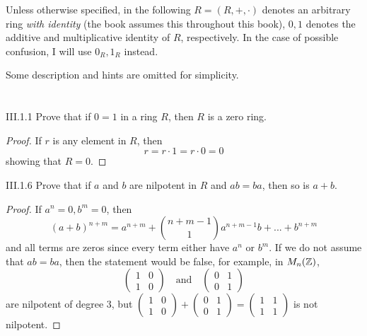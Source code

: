 Unless otherwise specified, in the following $R = (R,+,\cdot)$ denotes an arbitrary ring \emph{with identity} (the book assumes this throughout this book), $0, 1$ denotes the additive and multiplicative identity of $R$, respectively. In the case of possible confusion, I will use $0_R, 1_R$ instead. 

Some description and hints are omitted for simplicity.

\section{}

\begin{problem}{III.1.1}
Prove that if $0 = 1$ in a ring $R$, then $R$ is a zero ring.
\end{problem}
\begin{proof}
If $r$ is any element in $R$, then
\[
r = r \cdot 1 = r \cdot 0 = 0  
\]
showing that $R = 0$.
\end{proof}
\begin{problem}{III.1.6}
Prove that if $a$ and $b$ are nilpotent in $R$ and $ab = ba$, then so is $a+b$.
\end{problem}
\begin{proof}
If $a^n = 0, b^m = 0$, then
\[
(a+b)^{n+m} = a^{n+m} +\binom{n+m-1}{1} a^{n+m-1}b + ... + b^{n+m}
\]
and all terms are zeros since every term either have $a^n$ or $b^m$. If we do not assume that $ab = ba$, then the statement would be false, for example, in $M_n(\mathbb{Z})$,
\[
\begin{pmatrix} 
1 & 0 \\
1 & 0
\end{pmatrix}
\quad \text{and} \quad
\begin{pmatrix} 
0 & 1 \\
0 & 1 
\end{pmatrix}
\]
are nilpotent of degree $3$, but
$\begin{pmatrix} 
1 & 0 \\
1 & 0
\end{pmatrix} + 
\begin{pmatrix} 
0 & 1 \\
0 & 1 
\end{pmatrix} = 
\begin{pmatrix} 
1 & 1 \\
1 & 1
\end{pmatrix}$ is not nilpotent.
\end{proof}

